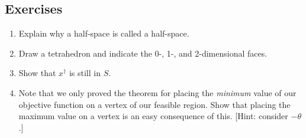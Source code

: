 \documentclass[a4paper,leqno]{article}
\numberwithin{equation}{section}
\theoremstyle{definition}
\theoremstyle{remark}
\begin{document}
\subsection*{Exercises}
\begin{enumerate}
  \item Explain why a half-space is called a half-space.
  \item Draw a tetrahedron and indicate the 0-, 1-, and 2-dimensional faces.
  \item Show that $ x^\dagger $ is still in $ S $.
  \item Note that we only proved the theorem for placing the \emph{minimum} value of our objective function on a vertex of our feasible
        region. Show that placing the maximum value on a vertex is an easy consequence of this. [Hint: consider $ -\theta $.]
\end{enumerate}
\end{document}
